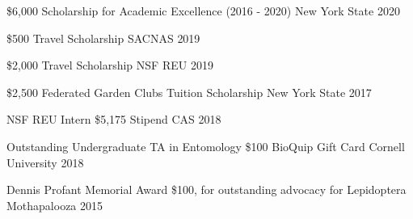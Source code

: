 \begin{cvhonors}

  \cvhonor
    {\$6,000} %
    {Scholarship for Academic Excellence (2016 - 2020)} %
    {New York State} %
    {2020} %

  \cvhonor
    {\$500} %
    {Travel Scholarship} %
    {SACNAS} %
    {2019} %

  \cvhonor
    {\$2,000} %
    {Travel Scholarship} %
    {NSF REU} %
    {2019} %

  \cvhonor
    {\$2,500} %
    {Federated Garden Clubs Tuition Scholarship} %
    {New York State} %
    {2017} %

\end{cvhonors}



\begin{cvhonors}

  \cvhonor
    {NSF REU Intern} %
    {\$5,175 Stipend} %
    {CAS} %
    {2018} %

  \cvhonor
    {Outstanding Undergraduate TA in Entomology} %
    {\$100 BioQuip Gift Card} %
    {Cornell University} %
    {2018} %

  \cvhonor
    {Dennis Profant Memorial Award} %
    {\$100, for outstanding advocacy for Lepidoptera} %
    {Mothapalooza} %
    {2015} %

\end{cvhonors}